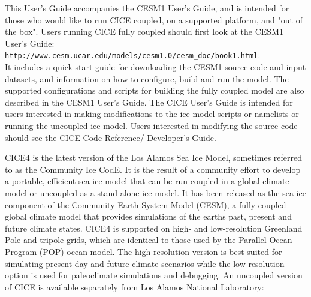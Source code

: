 
This User's Guide accompanies the CESM1 User's Guide, and is intended
for those who would like to run CICE coupled, on a supported
platform, and "out of the box".  Users running CICE fully coupled should first
look at the CESM1 User's Guide:\\


    {\tt http://www.cesm.ucar.edu/models/cesm1.0/cesm\_doc/book1.html}.\\

It includes a quick start guide for downloading the CESM1 source code and 
input datasets, and information on how to configure,
build and run the model.  The supported configurations and scripts for building
the fully coupled model are also described in the CESM1 User's Guide.  The CICE
User's Guide is intended for users interested in making modifications to the
ice model scripts or namelists or running the uncoupled ice model.  Users
interested in modifying the source code should see the CICE Code Reference/
Developer's Guide.

CICE4 is the latest version of the Los Alamos Sea Ice Model, sometimes
referred to as the Community Ice CodE.  It is the
result of a community effort to develop a portable, efficient sea ice model
that can be run coupled in a global climate model or uncoupled as a stand-alone
ice model. It has been released as the sea ice component of the Community
Earth System Model (CESM), a fully-coupled global climate model that
provides simulations of the earths past, present and future climate states.
CICE4 is supported on high- and low-resolution Greenland Pole
and tripole grids, which are identical to those used by the Parallel Ocean 
Program (POP) ocean model.  The high resolution version is best suited for 
simulating present-day and future climate scenarios while the low resolution 
option is used for paleoclimate simulations and debugging.  An uncoupled 
version of CICE is available separately from Los Alamos National Laboratory:\\

